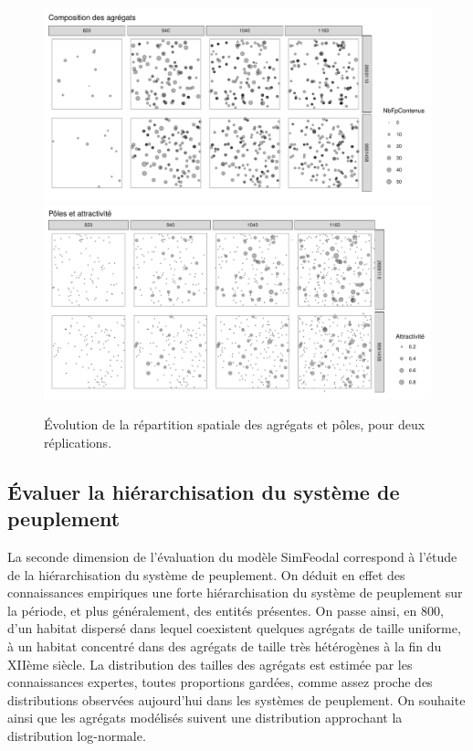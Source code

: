 \begin{figure}[H]
\captionsetup{width=\linewidth}
\includegraphics[width=\linewidth]{img/resultats/v0_cartes_agregats.pdf}
\includegraphics[width=\linewidth]{img/resultats/v0_cartes_poles.pdf}
\caption{Évolution de la répartition spatiale des agrégats et pôles, pour deux réplications.}
\label{fig:cartes-agregats-v0}
\end{figure}

\clearpage

\subsection{Évaluer la hiérarchisation du système de peuplement}

La seconde dimension de l'évaluation du modèle SimFeodal correspond à l'étude de la hiérarchisation du système de peuplement.
On déduit en effet des connaissances empiriques une forte hiérarchisation du système de peuplement sur la période, et plus généralement, des entités présentes.
On passe ainsi, en 800, d'un habitat dispersé dans lequel coexistent quelques agrégats de taille uniforme, à un habitat concentré dans des agrégats de taille très hétérogènes à la fin du XIIème siècle.
La distribution des tailles des agrégats est estimée par les connaissances expertes, toutes proportions gardées, comme assez proche des distributions observées aujourd'hui dans les systèmes de peuplement.
On souhaite ainsi que les agrégats modélisés suivent une distribution approchant la distribution log-normale.

